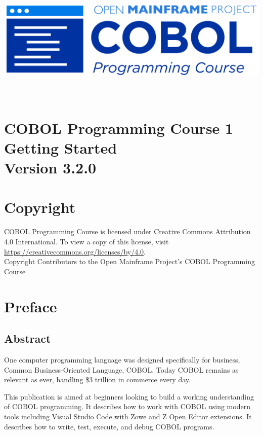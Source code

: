 \begin{center}
  \vspace*{25pt}
\includegraphics[width=\textwidth]{Images/COBOL-Programming-Course.png}
\hypertarget{cobol-programming-course-1}{%
\section*{
  \\[35pt]
  \Huge COBOL Programming Course 1 \\[10pt]
  \Huge Getting Started \\[15pt]
  \Large Version 3.2.0}\label{cobol-programming-course-1}}
\end{center}

\pagebreak
\hypertarget{copyright}{%
\section*{Copyright}{
  \normalsize COBOL Programming Course is licensed under Creative Commons 
  Attribution 4.0 International. To view a copy of this license, visit 
  \href{https://creativecommons.org/licenses/by/4.0}{https://creativecommons.org/licenses/by/4.0}. \\[10pt]
  Copyright Contributors to the Open Mainframe Project's COBOL Programming Course}\label{copyright}}
\pagebreak

\hypertarget{preface}{%
\section*{Preface}\label{preface}}

\hypertarget{abstract}{%
\subsection*{Abstract}\label{abstract}}

One computer programming language was designed specifically for
business, Common Business-Oriented Language, COBOL. Today COBOL remains
as relevant as ever, handling \$3 trillion in commerce every day.

This publication is aimed at beginners looking to build a working
understanding of COBOL programming. It describes how to work with COBOL
using modern tools including Visual Studio Code with Zowe and Z Open
Editor extensions. It describes how to write, test, execute, and debug
COBOL programs.

